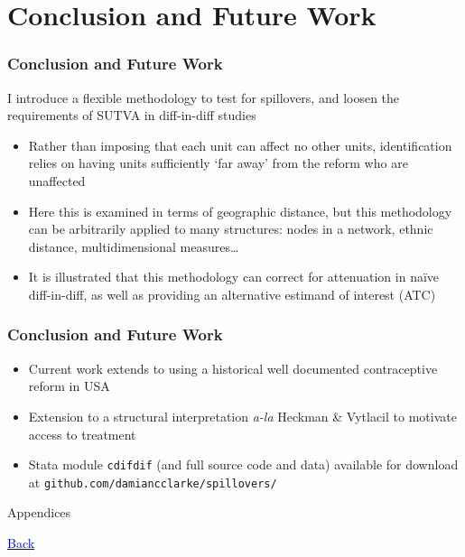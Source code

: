 \documentclass[10pt,letterpaper,subeqn]{beamer}
\begin{document}
\section{Conclusion and Future Work}
\begin{frame}[label=concl]
  \frametitle{Conclusion and Future Work}
I introduce a flexible methodology to test for spillovers, and loosen the 
requirements of SUTVA in diff-in-diff studies
\vspace{4mm}
\begin{itemize}
\item Rather than imposing that each unit can affect no other units, identification
relies on having units sufficiently `far away' from the reform who are unaffected
\item Here this is examined in terms of geographic distance, but this methodology
can be arbitrarily applied to many structures: nodes in a network, ethnic distance, 
multidimensional measures\ldots
\item It is illustrated that this methodology can correct for attenuation in
na\"ive diff-in-diff, as well as providing an alternative estimand of interest (ATC)
\end{itemize}
\end{frame}


\begin{frame}[label=future]
  \frametitle{Conclusion and Future Work}
\begin{itemize}
\item Current work extends to using a historical well documented contraceptive
 reform in USA
\item Extension to a structural interpretation \emph{a-la} Heckman \& Vytlacil to
 motivate access to treatment
\item Stata module \texttt{cdifdif} (and full source code and data) 
  available for download at \texttt{github.com/damiancclarke/spillovers/}
\end{itemize}
\end{frame}


\begin{frame}
\begin{center}
\Large Appendices
\end{center}
\end{frame}

\begin{frame}[label=ChileDesc]

\hyperlink{empirA}{\textcolor{blue}{Back}}
\end{frame}
\end{document}
